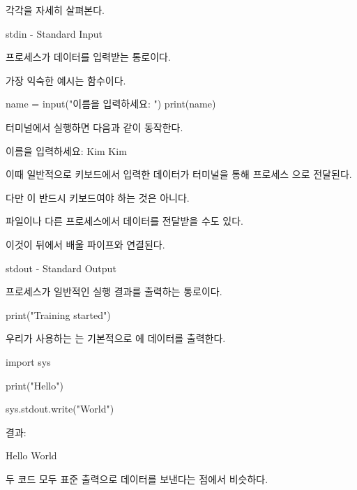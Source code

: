 각각을 자세히 살펴본다.

\begin{dhknote}
\begin{dhksmry}[centered]
stdin - Standard Input
\end{dhksmry}
\end{dhknote}

프로세스가 데이터를 입력받는 통로이다.

가장 익숙한 예시는  함수이다.

\begin{dhkcode}
name = input("이름을 입력하세요: ")
print(name)
\end{dhkcode}

터미널에서 실행하면 다음과 같이 동작한다.

\begin{dhkzsh}
이름을 입력하세요: Kim
Kim
\end{dhkzsh}

이때 일반적으로 키보드에서 입력한 데이터가 터미널을 통해 프로세스 으로 전달된다.

다만 이 반드시 키보드여야 하는 것은 아니다.

파일이나 다른 프로세스에서 데이터를 전달받을 수도 있다.

이것이 뒤에서 배울 파이프와 연결된다.

\begin{dhknote}
\begin{dhksmry}[centered]
stdout - Standard Output
\end{dhksmry}
\end{dhknote}

프로세스가 일반적인 실행 결과를 출력하는 통로이다.

\begin{dhkcode}
print("Training started")
\end{dhkcode}

우리가 사용하는 는 기본적으로 에 데이터를 출력한다.

\begin{dhkcode}
import sys

print("Hello")

sys.stdout.write("World\n")
\end{dhkcode}

결과:

\begin{dhkzsh}
Hello
World
\end{dhkzsh}

두 코드 모두 표준 출력으로 데이터를 보낸다는 점에서 비슷하다.

